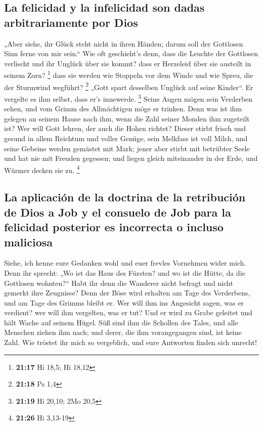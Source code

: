 \hypertarget{la-felicidad-y-la-infelicidad-son-dadas-arbitrariamente-por-dios}{%
\subsection{La felicidad y la infelicidad son dadas arbitrariamente por
Dios}\label{la-felicidad-y-la-infelicidad-son-dadas-arbitrariamente-por-dios}}

 „Aber siehe, ihr Glück steht nicht in ihren Händen;
darum soll der Gottlosen Sinn ferne von mir sein.``  Wie
oft geschieht's denn, dass die Leuchte der Gottlosen verlischt und ihr
Unglück über sie kommt? dass er Herzeleid über sie austeilt in seinem
Zorn? \footnote{\textbf{21:17} Hi 18,5; Hi 18,12}  dass
sie werden wie Stoppeln vor dem Winde und wie Spreu, die der Sturmwind
wegführt? \footnote{\textbf{21:18} Ps 1,4}  „Gott spart
desselben Unglück auf seine Kinder``. Er vergelte es ihm selbst, dass
er's innewerde. \footnote{\textbf{21:19} Hi 20,10; 2Mo 20,5}
 Seine Augen mögen sein Verderben sehen, und vom Grimm
des Allmächtigen möge er trinken.  Denn was ist ihm
gelegen an seinem Hause nach ihm, wenn die Zahl seiner Monden ihm
zugeteilt ist?  Wer will Gott lehren, der auch die Hohen
richtet?  Dieser stirbt frisch und gesund in allem
Reichtum und voller Genüge,  sein Melkfass ist voll
Milch, und seine Gebeine werden gemästet mit Mark;  jener
aber stirbt mit betrübter Seele und hat nie mit Freuden gegessen;
 und liegen gleich miteinander in der Erde, und Würmer
decken sie zu. \footnote{\textbf{21:26} Hi 3,13-19}

\hypertarget{la-aplicaciuxf3n-de-la-doctrina-de-la-retribuciuxf3n-de-dios-a-job-y-el-consuelo-de-job-para-la-felicidad-posterior-es-incorrecta-o-incluso-maliciosa}{%
\subsection{La aplicación de la doctrina de la retribución de Dios a Job
y el consuelo de Job para la felicidad posterior es incorrecta o incluso
maliciosa}\label{la-aplicaciuxf3n-de-la-doctrina-de-la-retribuciuxf3n-de-dios-a-job-y-el-consuelo-de-job-para-la-felicidad-posterior-es-incorrecta-o-incluso-maliciosa}}

 Siehe, ich kenne eure Gedanken wohl und euer frevles
Vornehmen wider mich.  Denn ihr sprecht: „Wo ist das Haus
des Fürsten? und wo ist die Hütte, da die Gottlosen wohnten?{}``
 Habt ihr denn die Wanderer nicht befragt und nicht
gemerkt ihre Zeugnisse?  Denn der Böse wird erhalten am
Tage des Verderbens, und am Tage des Grimms bleibt er. 
Wer will ihm ins Angesicht sagen, was er verdient? wer will ihm
vergelten, was er tut?  Und er wird zu Grabe geleitet und
hält Wache auf seinem Hügel.  Süß sind ihm die Schollen
des Tales, und alle Menschen ziehen ihm nach; und derer, die ihm
vorangegangen sind, ist keine Zahl.  Wie tröstet ihr mich
so vergeblich, und eure Antworten finden sich unrecht!


